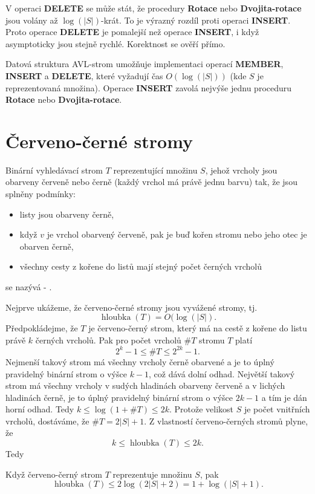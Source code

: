 \documentclass[a4paper,12pt]{article}
\def \emph#1{\underbar{#1}}
\DeclareMathOperator*{\hloubka}{hloubka}
\begin{document}
V operaci {\bf DELETE} se může stát, že procedury 
{\bf Rotace} nebo {\bf Dvojita-rotace} jsou volány až $\log(
|S|)$-krát. 
To je výrazný rozdíl proti operaci {\bf INSERT}. Proto operace 
{\bf DELETE} je pomalejší než operace {\bf INSERT}, i když 
asymptoticky jsou stejně rychlé. Korektnost se 
ověří přímo.

Datová struktura AVL-strom 
umožňuje implementaci operací {\bf MEMBER}, {\bf INSERT} a 
{\bf DELETE}, které vyžadují čas $O(\log(|S|))$ (kde $
S$ je 
reprezentovaná množina).  Ope\-race {\bf INSERT} zavolá 
nejvýše jednu proceduru {\bf Rotace} nebo {\bf Dvo\-ji\-ta-rotace}.  
\endproclaim

\section{Červeno-černé stromy}

Binární vyhledávací strom $T$ reprezentující 
množinu $S$, jehož vrcholy jsou obarveny červeně nebo 
černě (každý vrchol má právě jednu barvu) tak, že jsou 
splněny podmínky:
\begin{itemize}
\item
listy jsou obarveny černě,
\item
když $v$ je vrchol obarvený červeně, pak je buď kořen 
stromu nebo jeho otec je obarven černě,
\item
všechny cesty z kořene do listů mají stejný 
počet čer\-ných vrcholů
\end{itemize}
se nazývá \emph{červeno}-\emph{černý} \emph{strom}. 

Nejprve ukážeme, že červeno-černé stromy jsou 
vyvážené stro\-my, tj. $$\hloubka(T)=O(\log(|S|).$$
Předpokládejme, že $T$ je červeno-černý strom, který má 
na cestě z kořene do listu právě $k$ černých 
vrcholů. Pak pro počet vrcholů $\#T$ 
stromu $T$ platí 
$$2^k-1\le \#T\le 2^{2k}-1.$$
Nejmenší takový strom má všechny vrcholy černě 
obarvené a je to úplný pravidelný binární strom o 
výšce $k-1$, což dává dolní odhad.  Největší takový 
strom má všechny vrcholy v sudých hladinách obarveny 
červeně a v lichých hladinách černě, je to úplný 
pravidelný binární strom o výšce $2k-1$ a tím je dán 
horní odhad. Tedy $k\le\log(1+\#T)\le 2k$.
Protože velikost $S$ je počet vnitřních vrcholů, 
dostáváme, že $\#T=2|S|+1$. Z vlastností červeno-černých 
stromů plyne, že 
$$k\le\hloubka(T)\le 2k.$$
Tedy

Když červeno-černý strom $T$ 
reprezentuje množinu $S$, pak $$\hloubka(T)\le 2\log(2|S|+2)=1+\log(|S|+1).$$
\endproclaim
\end{document}
